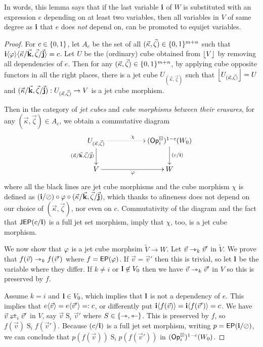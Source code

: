 \documentclass[a4paper]{memoir}
\begin{document}
In words, this lemma says that if the last variable $\mathbf{i}$ of $W$ is substituted with an expression $e$ depending on at least two variables, then all variables in $V$ of same degree as $\mathbf{i}$ that $e$ does \emph{not} depend on, can be promoted to equijet variables.
\begin{proof}
	For $c \in \mathopen{}\left\{ 0, 1 \right\}\mathclose{}$, let $A_c$ be the set of all $(\vec \kappa, \vec \zeta) \in \mathopen{}\left\{ 0, 1 \right\}\mathclose{}^{m+n}$ such that $\mathbf{i} \langle \varphi \rangle \langle \vec \kappa / \vec{\mathbf{k}}, \vec \zeta / \vec{\mathbf{j}} \rangle = c$.
	Let $U$ be the (ordinary) cube obtained from $\mathopen{}\left\lfloor V \right\rfloor\mathclose{}$ by removing all dependencies of $e$.
	Then for any $(\vec \kappa, \vec \zeta) \in \mathopen{}\left\{ 0, 1 \right\}\mathclose{}^{m+n}$, by applying cube opposite functors in all the right places, there is a jet cube $U_{(\vec \kappa, \vec \zeta)}$ such that $\mathopen{}\left\lfloor U_{(\vec \kappa, \vec \zeta)} \right\rfloor\mathclose{} = U$ and $(\vec \kappa / \vec{\mathbf{k}}, \vec \zeta / \vec{\mathbf{j}}) : U_{(\vec \kappa, \vec \zeta)} \to V$ is a jet cube morphism.
	
	Then in the category of \emph{jet cubes} and \emph{cube morphisms between their erasures}, for any $(\vec \kappa, \vec \zeta) \in A_c$, we obtain a commutative diagram
	\[
		\xymatrix{
			U_{(\vec \kappa, \vec \zeta)}
				\ar[d]_{(\vec \kappa / \vec{\dm k}, \vec \zeta / \vec{\dm j})}
				\ar@{.>}[rr]^\chi
			&&
			(\Opcube_i)^{1-c}(W_0)
				\ar[d]^{(c/\dm i)}
			\\
			V
				\ar[rr]_{\vfi}
			&&
			W
		}
	\]
	where all the black lines are jet cube morphisms and the cube morphism $\chi$ is defined as $(\mathbf{i} / \oslash) \circ \varphi \circ (\vec \kappa / \vec{\mathbf{k}}, \vec \zeta / \vec{\mathbf{j}})$, which thanks to afineness does not depend on our choice of $(\vec \kappa, \vec \zeta)$, nor even on $c$.
	Commutativity of the diagram and the fact that $\mathsf{JEP}(c/\mathbf{i})$ is a full jet set morphism, imply that $\chi$, too, is a jet cube morphism.
	
	We now show that $\varphi$ is a jet cube morphsim $\tilde V \to W$.
	Let $\vec v \rightarrowtriangle_k \vec v'$ in $\tilde V$.
	We prove that $f(\vec v) \rightarrowtriangle_k f(\vec v')$ where $f = \mathsf{EP}(\varphi)$.
	If $\vec v = \vec v'$ then this is trivial, so let $\mathbf{l}$ be the variable where they differ.
	If $k \neq i$ or $\mathbf{l} \not\in V_0$ then we have $\vec v \rightarrowtriangle_k \vec v'$ in $V$ so this is preserved by $f$.
	
	Assume $k = i$ and $\mathbf{l} \in V_0$, which implies that $\mathbf{l}$ is not a dependency of $e$.
	This implies that $e \langle \vec v \rangle = e \langle \vec v' \rangle =: c$, or differently put $\mathbf{i} \langle f(\vec v) \rangle = \mathbf{i} \langle f(\vec v') \rangle = c$.
	We have $\vec v \infrajet_i \vec v'$ in $V$, say $\vec v \mathrel{S}_i \vec v'$ where $S \in \mathopen{}\left\{ \rightarrowtriangle, \leftarrowtriangle \right\}\mathclose{}$.
	This is preserved by $f$, so $f(\vec v) \mathrel{S}_i f(\vec v')$.
	Because $(c/\mathbf{i})$ is a full jet set morphism, writing $p = \mathsf{EP}(\mathbf{i} / \oslash)$, we can conclude that $p(f(\vec v)) \mathrel{S}_i p(f(\vec v'))$ in $({\mathsf{Op}}^\boxdot_i)^{1-c}(W_0)$.
	

\end{proof}
\end{document}
